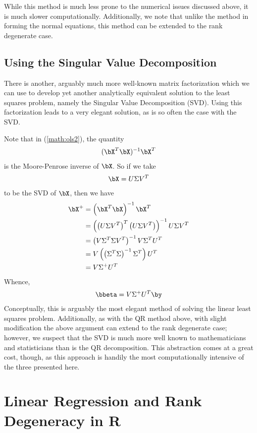 While this method is much less prone to the numerical issues discussed above, it is much slower computationally.  Additionally, we note that unlike the method in forming the normal equations, this method can be extended to the rank degenerate case.




\section{Using the Singular Value Decomposition}
There is another, arguably much more well-known matrix factorization which we can use to develop yet another analytically equivalent solution to the least squares problem, namely the Singular Value Decomposition (SVD).  Using this factorization leads to a very elegant solution, as is so often the case with the SVD.  

Note that in (\ref{math:ols2}), the quantity
\begin{align*}
(\bX^T\bX)^{-1}\bX^T
\end{align*}
is the Moore-Penrose inverse of $\bX$.  So if we take
\begin{align*}
\bX = U\Sigma V^T
\end{align*}
to be the SVD of $\bX$, then we have
\begin{align*}
\bX^+ &= \left(\bX^T\bX\right)^{-1}\bX^T\\
  &= \left( \left(U\Sigma V^T\right)^T \left(U\Sigma V^T\right) \right)^{-1} U\Sigma V^T\\
  &= \left( V\Sigma^T\Sigma V^T \right)^{-1} V\Sigma^T U^T\\
  &= V \left( \left(\Sigma^T\Sigma\right)^{-1} \Sigma^T \right) U^T\\
  &= V \Sigma^+ U^T
\end{align*}
Whence,
\begin{align*}
\bbeta = V\Sigma^+ U^T\by
\end{align*}
Conceptually, this is arguably the most elegant method of solving the linear least squares problem.  Additionally, as with the QR method above, with slight modification the above argument can extend to the rank degenerate case; however, we suspect that the SVD is much more well known to mathematicians and statisticians than is the QR decomposition.  This abstraction comes at a great cost, though, as this approach is handily the most computationally intensive of the three presented here.




\chapter{Linear Regression and Rank Degeneracy in R}

